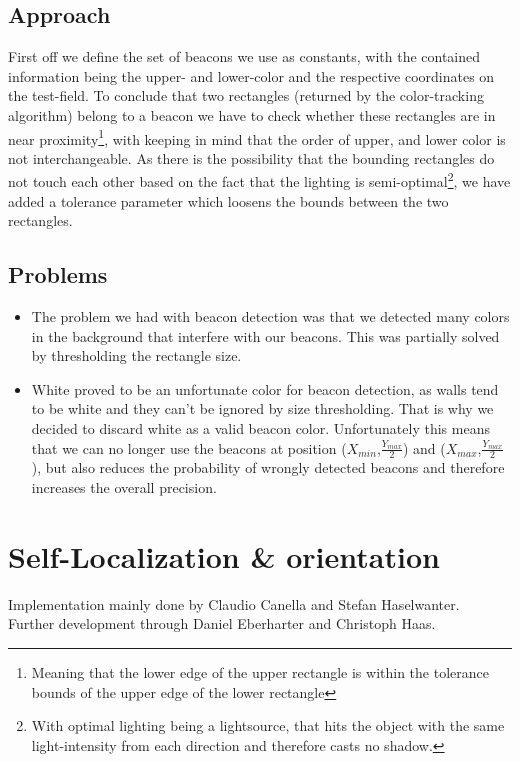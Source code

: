 \documentclass[703031]{iisreport}
\begin{document}
\subsection{Approach}
First off we define the set of beacons we use as constants, with the contained information being the upper- and lower-color and the respective coordinates on the test-field. To conclude that two rectangles (returned by the color-tracking algorithm) belong to a beacon we have to check whether these rectangles are in near proximity\footnote{Meaning that the lower edge of the upper rectangle is within the tolerance bounds of the upper edge of the lower rectangle}, with keeping in mind that the order of upper, and lower color is not interchangeable. 
As there is the possibility that the bounding rectangles do not touch each other based on the fact that the lighting is semi-optimal\footnote{With optimal lighting being a lightsource, that hits the object with the same light-intensity from each direction and therefore casts no shadow.}, we have added a tolerance parameter which loosens the bounds between the two rectangles.

\subsection{Problems}
	\begin{itemize}
		\item The problem we had with beacon detection was that we detected many colors in the background that interfere with our beacons. This was partially solved by thresholding the rectangle size.
		\item White proved to be an unfortunate color for beacon detection, as walls tend to be white and they can't be ignored by size thresholding. That is why we decided to discard white as a valid beacon color. Unfortunately this means that we can no longer use the beacons at position ($X_{min}$,$\frac{Y_{max}}{2}$) and ($X_{max}$,$\frac{Y_{max}}{2}$), but also reduces the probability of wrongly detected beacons and therefore increases the overall precision.
	\end{itemize}


\section{Self-Localization \& orientation}
Implementation mainly done by Claudio Canella and Stefan Haselwanter. \\
Further development through Daniel Eberharter and Christoph Haas.
\end{document}
